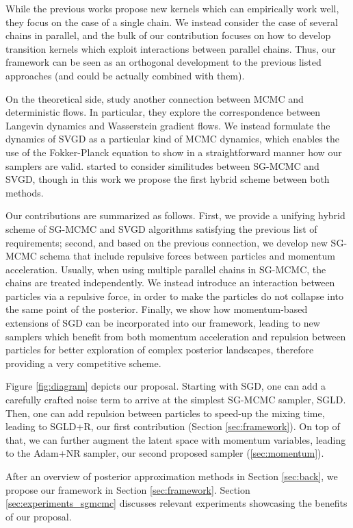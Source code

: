 While the previous works propose new kernels which can empirically work well, they focus on the case of a single chain. We instead consider the case of several chains in parallel, and the bulk of our contribution focuses on how to develop transition kernels which exploit interactions between parallel chains. Thus, our framework can be seen as an orthogonal development to the previous listed approaches (and could be actually combined with them).

On the theoretical side, \textcite{chen2018unified} study another connection between MCMC and deterministic flows. In particular, they explore the correspondence between Langevin dynamics and Wasserstein gradient flows.
We instead formulate the dynamics of SVGD as a particular kind of MCMC dynamics, which enables the use of the Fokker-Planck equation to show in a straightforward manner how our samplers are valid. \textcite{liu2017stein} started to consider similitudes between SG-MCMC and SVGD, though in this work we propose the first hybrid scheme between both methods.



Our contributions are summarized as follows. First, we provide a unifying hybrid scheme of SG-MCMC and SVGD algorithms satisfying the previous list of requirements; second, and based on the previous connection, 
we develop new SG-MCMC schema that include repulsive forces between particles and momentum acceleration. Usually, when using multiple parallel chains in SG-MCMC, the chains are treated independently. We instead introduce an interaction between particles via a repulsive force, in order to make the particles do not collapse into the same point of the posterior.
Finally, we show how momentum-based extensions of SGD can be incorporated into our framework, leading to new samplers which benefit from both momentum acceleration and repulsion between particles for better exploration of complex posterior landscapes, therefore providing a very competitive scheme. 

Figure \ref{fig:diagram} depicts our proposal. Starting with SGD, one can add a carefully crafted noise term to arrive at the simplest SG-MCMC sampler, SGLD. Then, one can add repulsion between particles to speed-up the mixing time, leading to SGLD+R, our first contribution (Section \ref{sec:framework}). On top of that, we can further augment the latent space with momentum variables, leading to the Adam+NR sampler, our second proposed sampler (\ref{sec:momentum}).

After an overview of posterior approximation methods in Section \ref{sec:back}, we propose our framework in Section \ref{sec:framework}.
Section \ref{sec:experiments_sgmcmc} discusses relevant experiments showcasing the benefits of our proposal. %



